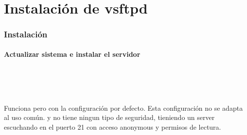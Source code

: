 \section{Instalaci\'on de vsftpd}
  \begin{frame}
    \frametitle{Instalaci\'on}
		\framesubtitle{Actualizar sistema e instalar el servidor}
	    \begin{shell}
	      \\ 
	      \\ \\
	    \hline\end{shell}
		Funciona pero con la configuración por defecto. Esta configuración no se adapta al uso común. y no tiene ningun tipo de seguridad, tieniendo un server escuchando en el puerto 21 con acceso anonymous y permisos de lectura.
  \end{frame}